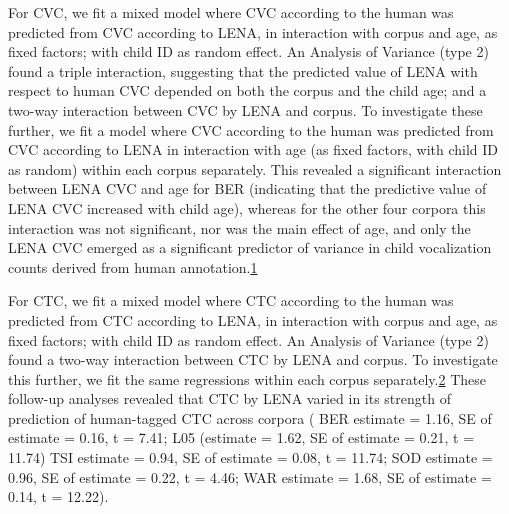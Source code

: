 \documentclass[english,floatsintext,man]{apa6}
\begin{document}
For CVC, we fit a mixed model where CVC according to the human was
predicted from CVC according to LENA, in interaction with corpus and
age, as fixed factors; with child ID as random effect. An Analysis of
Variance (type 2) found a triple interaction, suggesting that the
predicted value of LENA with respect to human CVC depended on both the
corpus and the child age; and a two-way interaction between CVC by LENA
and corpus. To investigate these further, we fit a model where CVC
according to the human was predicted from CVC according to LENA in
interaction with age (as fixed factors, with child ID as random) within
each corpus separately. This revealed a significant interaction between
LENA CVC and age for BER (indicating that the predictive value of LENA
CVC increased with child age), whereas for the other four corpora this
interaction was not significant, nor was the main effect of age, and
only the LENA CVC emerged as a significant predictor of variance in
child vocalization counts derived from human
annotation.\href{For\%20both\%20BER\%20and\%20WAR,\%20the\%20variance\%20associated\%20to\%20the\%20child\%20ID\%20random\%20factor\%20was\%20zero.\%20This\%20suggests\%20a\%20mixed\%20model\%20was\%20not\%20necessary,\%20as\%20child\%20ID\%20is\%20not\%20explaining\%20any\%20additional\%20variance,\%20but\%20it\%20does\%20not\%20alter\%20the\%20interpretation\%20in\%20the\%20main\%20text.}{1}

For CTC, we fit a mixed model where CTC according to the human was
predicted from CTC according to LENA, in interaction with corpus and
age, as fixed factors; with child ID as random effect. An Analysis of
Variance (type 2) found a two-way interaction between CTC by LENA and
corpus. To investigate this further, we fit the same regressions within
each corpus
separately.\href{For\%20both\%20TSI\%20and\%20WAR,\%20the\%20variance\%20associated\%20to\%20the\%20child\%20ID\%20random\%20factor\%20was\%20zero.\%20This\%20suggests\%20a\%20mixed\%20model\%20was\%20not\%20necessary,\%20as\%20child\%20ID\%20is\%20not\%20explaining\%20any\%20additional\%20variance,\%20but\%20it\%20does\%20not\%20alter\%20the\%20interpretation\%20in\%20the\%20main\%20text.}{2}
These follow-up analyses revealed that CTC by LENA varied in its
strength of prediction of human-tagged CTC across corpora ( BER estimate
= 1.16, SE of estimate = 0.16, t = 7.41; L05 (estimate = 1.62, SE of
estimate = 0.21, t = 11.74) TSI estimate = 0.94, SE of estimate = 0.08,
t = 11.74; SOD estimate = 0.96, SE of estimate = 0.22, t = 4.46; WAR
estimate = 1.68, SE of estimate = 0.14, t = 12.22).
\end{document}
